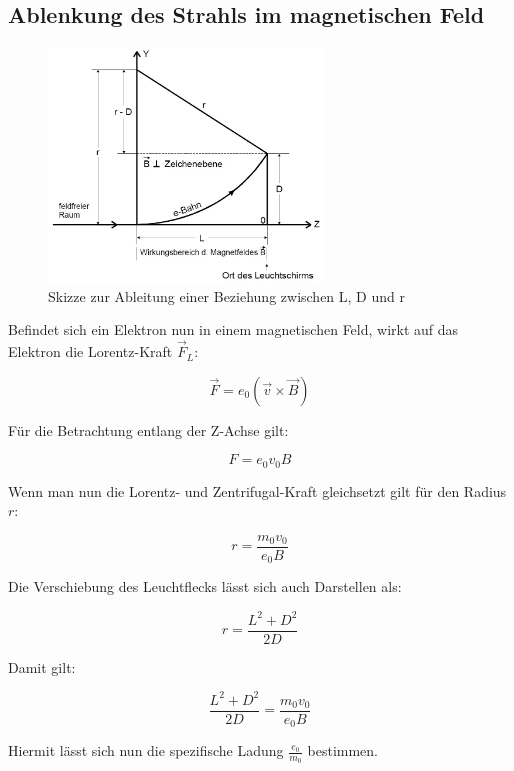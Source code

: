 \subsection{Ablenkung des Strahls im magnetischen Feld}
\begin{figure}[h]
  \centering
  \includegraphics[width=0.65\textwidth]{Grafiken/V501(2)_Abb2.jpg}
  \caption{Skizze zur Ableitung einer Beziehung zwischen L, D und r}
\end{figure}
Befindet sich ein Elektron nun in einem magnetischen Feld, wirkt auf das Elektron die Lorentz-Kraft $\vec{F}_L$:

\begin{equation}
  \vec{F} = e_0 (\vec{v} \times \vec{B})
\end{equation}

Für die Betrachtung entlang der Z-Achse gilt:

\begin{equation}
  F = e_0 v_0 B
\end{equation}

Wenn man nun die Lorentz- und Zentrifugal-Kraft gleichsetzt gilt für den Radius $r$:

\begin{equation}
  r = \frac{m_0v_0}{e_0B}
\end{equation}

Die Verschiebung des Leuchtflecks lässt sich auch Darstellen als:

\begin{equation}
  r = \frac{L^2 + D^2}{2D}
\end{equation}

Damit gilt:

\begin{equation}
\label{eq:Theorie_Qspez}
  \frac{L^2 + D^2}{2D} = \frac{m_0v_0}{e_0B}
\end{equation}

Hiermit lässt sich nun die spezifische Ladung $\frac{e_0}{m_0}$ bestimmen.
